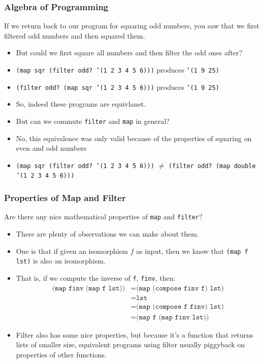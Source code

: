 \documentclass{beamer}
\begin{document}
\begin{frame}
  \frametitle{Algebra of Programming}
  If we return back to our program for squaring odd numbers, you saw
  that we first filtered odd numbers and then squared them.
  \begin{itemize}
  \item<2-> But could we first square all numbers and then filter the odd
    ones after?
  \item<3-> \texttt{(map sqr (filter odd? '(1 2 3 4 5 6)))}
    produces \texttt{'(1 9 25)}
  \item<4-> \texttt{(filter odd? (map sqr '(1 2 3 4 5 6)))}
    produces \texttt{'(1 9 25)}
  \item<5-> So, indeed these programs are equivlanet.
  \item<6-> But can we commute \texttt{filter} and \texttt{map} in general?
  \item<7-> No, this equivalence was only valid because of the properties of
    squaring on even and odd numbers
  \item<8-> \texttt{(map sqr (filter odd? '(1 2 3 4 5 6)))} $\ne$ \texttt{(filter odd? (map double '(1 2 3 4 5 6)))}
  \end{itemize}
\end{frame}

\begin{frame}
  \frametitle{Properties of Map and Filter}
  Are there any nice mathematical properties of \texttt{map} and \texttt{filter}?
  \begin{itemize}
  \item<2-> There are plenty of observations we can make about them.
  \item<3-> One is that if given an isomorphism $f$ as input, then we know
    that \texttt{(map f lst)} is also an isomorphism.
  \item<4-> That is, if we compute the inverse of \texttt{f}, \texttt{finv}, then:
    \begin{align*}
      \texttt{(map finv (map f lst))}
      &= \texttt{(map (compose finv f) lst)}\\
      &= \texttt{lst}\\
      &= \texttt{(map (compose f finv) lst)}\\
      &= \texttt{(map f (map finv lst))}
    \end{align*}
  \item<5-> Filter also has some nice properties, but because it's a function
    that returns lists of smaller size, equivalent programs using filter usually
    piggyback on properties of other functions.
  \end{itemize}
\end{frame}
\end{document}
